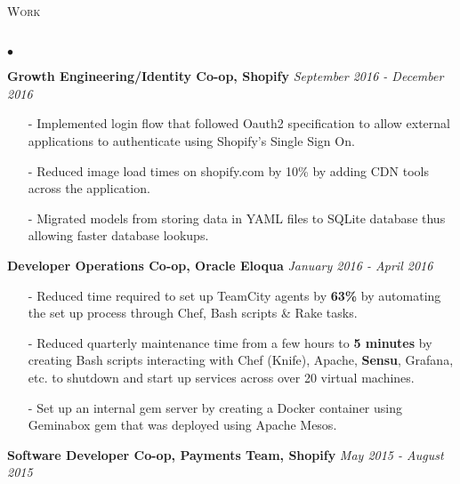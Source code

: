 \documentclass[11pt]{article}
\newcommand{\lineunder}{\vspace*{-8pt} \\ \hspace*{-18pt} \hrulefill \\}
\newcommand{\header}[1]{{\hspace*{-15pt}\vspace*{6pt} \textsc{#1}} \vspace*{-6pt} \lineunder }
\newenvironment{achievements}{\begin{list}{$\bullet$}{\topsep 0pt \itemsep -1.5pt \leftmargin 5pt}}{\vspace*{4pt}\end{list}}
\begin{document}
\header{\fontsize{11.1}{10}\selectfont Work}
\begin{achievements}

\item \textbf{{\fontsize{9.5}{10}\selectfont Growth Engineering/Identity Co-op, Shopify}} \hfill \textit {September 2016 - December 2016}


\begin{itemize}
\item[-] Implemented login flow that followed Oauth2 specification to allow external applications to authenticate using Shopify’s Single Sign On.
\vspace{2pt}
\item[-] Reduced image load times on shopify.com by 10\% by adding CDN tools across the application.
\vspace{2pt}
\item[-] Migrated models from storing data in YAML files to SQLite database thus allowing faster database lookups.
\end{itemize}
\vspace{4pt}

\item \textbf{{\fontsize{9.5}{10}\selectfont  Developer Operations Co-op, Oracle Eloqua}} \hfill \textit {January 2016 - April 2016}


\begin{itemize}
\item[-]Reduced time required to set up TeamCity agents by \textbf{63\%} by automating the set up process through Chef, Bash scripts \& Rake tasks.
\vspace{2pt}
\item[-]Reduced quarterly maintenance time from a few hours to \textbf{5 minutes} by creating Bash scripts interacting with Chef (Knife), Apache, \textbf{Sensu}, Grafana, etc. to shutdown and start up services across over 20 virtual machines.
\vspace{2pt}
\item[-]Set up an internal gem server by creating a Docker container using Geminabox gem that was deployed using Apache Mesos.
\end{itemize}
\vspace{4pt}
\item \textbf{{\fontsize{9.5}{10}\selectfont Software Developer Co-op, Payments Team, Shopify}} \hfill \textit {May 2015 - August 2015}


\end{achievements}
\end{document}
